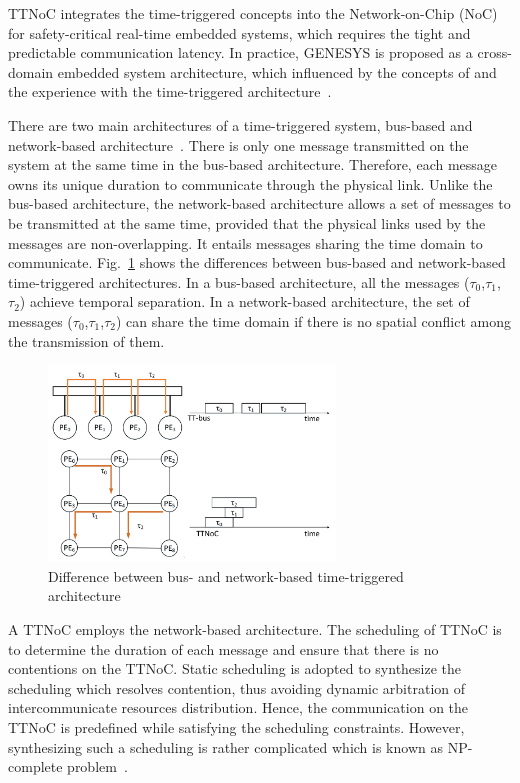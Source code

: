 \documentclass[journal]{IEEEtran}
\theoremstyle{remark}
\begin{document}
TTNoC integrates the time-triggered concepts into the Network-on-Chip (NoC) for safety-critical real-time embedded systems, which requires the tight and predictable communication latency.
In practice,
 GENESYS is proposed as a cross-domain embedded system architecture,
  which influenced by the concepts of and the experience with the time-triggered architecture~\cite{DBLP:conf/ladc/Kopetz11}.

There are two main architectures of a time-triggered system,
 bus-based and network-based architecture~\cite{DBLP:conf/date/HuangBRBK12}.
There is only one message transmitted on the system at the same time in the bus-based architecture. 
Therefore, each message owns its unique duration to communicate through the physical link.
Unlike the bus-based architecture,
 the network-based architecture allows a set of messages to be transmitted at the same time,
  provided that the physical links used by the messages are non-overlapping.
It entails messages sharing the time domain to communicate.
Fig.~\ref{f:diff} shows the differences between bus-based and network-based time-triggered architectures.
In a bus-based architecture,
 all the messages ($\tau_0$,$\tau_1$,$\tau_2$) achieve temporal separation. 
In a network-based architecture,
 the set of messages ($\tau_0$,$\tau_1$,$\tau_2$) can share the time domain if there is no spatial conflict among the transmission of them.
\begin{figure}[!t]
	\centering
	\includegraphics[width=3in]{picture/difference.pdf}
	\caption{Difference between bus- and network-based time-triggered architecture}
	\label{f:diff}
\end{figure}

A TTNoC employs the network-based architecture.
The scheduling of TTNoC is to determine the duration of each message and ensure that there is no contentions on the TTNoC. 
Static scheduling is adopted to synthesize the scheduling which resolves contention,
thus avoiding dynamic arbitration of intercommunicate resources distribution. 
Hence, the communication on the TTNoC is predefined while satisfying the scheduling constraints.
However,
 synthesizing such a scheduling is rather complicated which is known as NP-complete problem~\cite{DBLP:conf/date/HuangBRBK12,DBLP:conf/rtss/Steiner10}.
\end{document}
